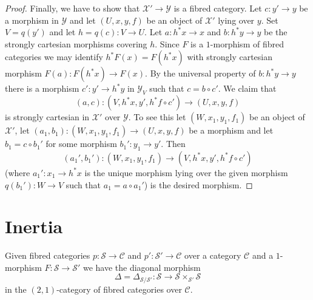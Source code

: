 \begin{proof}
\medskip\noindent
Finally, we have to show that $\mathcal{X}' \to \mathcal{Y}$ is a fibred
category. Let $c : y' \to y$ be a morphism in $\mathcal{Y}$
and let $(U, x, y, f)$ be an object of $\mathcal{X}'$ lying over $y$.
Set $V = q(y')$ and let $h = q(c) : V \to U$. Let $a : h^*x \to x$
and $b : h^*y \to y$ be the strongly cartesian morphisms covering $h$.
Since $F$ is a $1$-morphism of fibred categories we may identify
$h^*F(x) = F(h^*x)$ with strongly cartesian morphism
$F(a) : F(h^*x) \to F(x)$. By the universal property
of $b : h^*y \to y$ there is a morphism $c' : y' \to h^*y$ in
$\mathcal{Y}_V$ such that $c = b \circ c'$. We claim that
$$
(a, c) : (V, h^*x, y', h^*f \circ c') \longrightarrow (U, x, y, f)
$$
is strongly cartesian in $\mathcal{X}'$ over $\mathcal{Y}$. To see this
let $(W, x_1, y_1, f_1)$ be an object of $\mathcal{X}'$, let
$(a_1, b_1) : (W, x_1, y_1, f_1) \to (U, x, y, f)$ be a morphism
and let $b_1 = c \circ b_1'$ for some morphism $b_1' : y_1 \to y'$.
Then
$$
(a_1', b_1') : (W, x_1, y_1, f_1) \longrightarrow (V, h^*x, y', h^*f \circ c')
$$
(where $a_1' : x_1 \to h^*x$ is the unique morphism lying over the
given morphism $q(b_1') : W \to V$ such that $a_1 = a \circ a_1'$)
is the desired morphism.
\end{proof}





\section{Inertia}
\label{section-inertia}

\noindent
Given fibred categories $p : \mathcal{S} \to \mathcal{C}$ and
$p' : \mathcal{S}' \to \mathcal{C}$ over a category $\mathcal{C}$
and a $1$-morphism $F : \mathcal{S} \to \mathcal{S}'$
we have the diagonal morphism
$$
\Delta = \Delta_{\mathcal{S}/\mathcal{S}'} :
\mathcal{S} \longrightarrow \mathcal{S} \times_{\mathcal{S}'} \mathcal{S}
$$
in the $(2, 1)$-category of fibred categories over $\mathcal{C}$.

